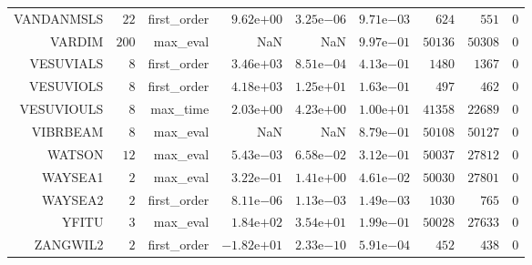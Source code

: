 \begin{longtable}{rrrrrrrrr}
VANDANMSLS & \(    22\) & first\_order & \( 9.62\)e\(+00\) & \( 3.25\)e\(-06\) & \( 9.71\)e\(-03\) & \(   624\) & \(   551\) & \(     0\) \\
VARDIM & \(   200\) & max\_eval &       NaN &       NaN & \( 9.97\)e\(-01\) & \( 50136\) & \( 50308\) & \(     0\) \\
VESUVIALS & \(     8\) & first\_order & \( 3.46\)e\(+03\) & \( 8.51\)e\(-04\) & \( 4.13\)e\(-01\) & \(  1480\) & \(  1367\) & \(     0\) \\
VESUVIOLS & \(     8\) & first\_order & \( 4.18\)e\(+03\) & \( 1.25\)e\(+01\) & \( 1.63\)e\(-01\) & \(   497\) & \(   462\) & \(     0\) \\
VESUVIOULS & \(     8\) & max\_time & \( 2.03\)e\(+00\) & \( 4.23\)e\(+00\) & \( 1.00\)e\(+01\) & \( 41358\) & \( 22689\) & \(     0\) \\
VIBRBEAM & \(     8\) & max\_eval &       NaN &       NaN & \( 8.79\)e\(-01\) & \( 50108\) & \( 50127\) & \(     0\) \\
WATSON & \(    12\) & max\_eval & \( 5.43\)e\(-03\) & \( 6.58\)e\(-02\) & \( 3.12\)e\(-01\) & \( 50037\) & \( 27812\) & \(     0\) \\
WAYSEA1 & \(     2\) & max\_eval & \( 3.22\)e\(-01\) & \( 1.41\)e\(+00\) & \( 4.61\)e\(-02\) & \( 50030\) & \( 27801\) & \(     0\) \\
WAYSEA2 & \(     2\) & first\_order & \( 8.11\)e\(-06\) & \( 1.13\)e\(-03\) & \( 1.49\)e\(-03\) & \(  1030\) & \(   765\) & \(     0\) \\
YFITU & \(     3\) & max\_eval & \( 1.84\)e\(+02\) & \( 3.54\)e\(+01\) & \( 1.99\)e\(-01\) & \( 50028\) & \( 27633\) & \(     0\) \\
ZANGWIL2 & \(     2\) & first\_order & \(-1.82\)e\(+01\) & \( 2.33\)e\(-10\) & \( 5.91\)e\(-04\) & \(   452\) & \(   438\) & \(     0\) \\\hline
\end{longtable}
